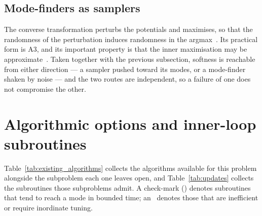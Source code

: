 \subsection{Mode-finders as samplers}

The converse transformation perturbs the potentials and maximises, so that the randomness of the perturbation induces randomness in the argmax~\citep{Papandreou2011, Hazan2012}. Its practical form is A3, and its important property is that the inner maximisation may be approximate~\citep{LazaroGredilla2021}. Taken together with the previous subsection, softness is reachable from either direction --- a sampler pushed toward its modes, or a mode-finder shaken by noise --- and the two routes are independent, so a failure of one does not compromise the other.

\section{Algorithmic options and inner-loop subroutines}
\label{sec:existing_algorithms}

Table~\ref{tab:existing_algorithms} collects the algorithms available for this problem alongside the subproblem each one leaves open, and Table~\ref{tab:updates} collects the subroutines those subproblems admit. A check-mark (\cmark) denotes subroutines that tend to reach a mode in bounded time; an \xmark\ denotes those that are inefficient or require inordinate tuning.

